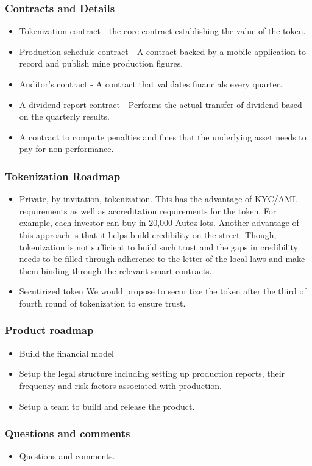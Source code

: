 \documentclass{beamer}
\begin{document}
\begin{frame}
  \frametitle {Contracts and Details}
  \begin{minipage}{\textwidth}
    \begin{itemize}
    \item  Tokenization contract - the core contract establishing the value of the token.
    \item  Production schedule contract - A contract backed by a mobile application to record and publish mine production figures.
    \item  Auditor's contract - A contract that validates financials every quarter.
    \item  A dividend report contract - Performs the actual transfer of dividend based on the quarterly results.
    \item  A contract to compute penalties and fines that the underlying asset needs to pay for non-performance.
    \end{itemize}
  \end{minipage}
\end{frame}

\begin{frame}
  \frametitle {Tokenization Roadmap}
  \begin{minipage}{\textwidth}
    \begin{itemize}
    \item  Private, by invitation, tokenization. This has the advantage of KYC/AML requirements as well as accreditation requirements for the token. For example, each investor can buy in 20,000 Autez lots. Another advantage of this approach is that it helps build credibility on the street. Though, tokenization is not sufficient to build such trust and the gaps in credibility needs to be filled through adherence to the letter of the local laws and make them binding through the relevant smart contracts.
    \item  Secutirized token
      We would propose to securitize the token after the third of fourth round of tokenization to ensure trust.
    \end{itemize}
  \end{minipage}
\end{frame}

\begin{frame}
  \frametitle {Product roadmap}
  \begin{minipage}{\textwidth}
    \begin{itemize}
      \item  Build the financial model
      \item  Setup the legal structure including setting up production reports, their frequency and risk factors associated with production.
      \item  Setup a team to build and release the product.
    \end{itemize}
  \end{minipage}
\end{frame}

\begin{frame}
  \frametitle {Questions and comments}
  \begin{minipage}{\textwidth}
    \begin{itemize}
      \item  Questions and comments.
    \end{itemize}
  \end{minipage}
\end{frame}
\end{document}
